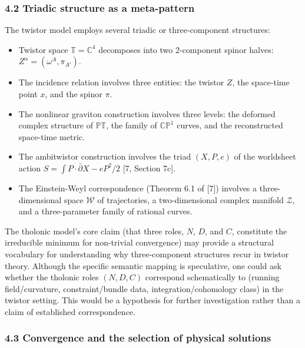 \documentclass[
  11pt,
  letterpaper,
]{article}
\providecommand{\tightlist}{%
  \setlength{\itemsep}{0pt}\setlength{\parskip}{0pt}}
\begin{document}
\subsubsection{4.2 Triadic structure as a
meta-pattern}\label{triadic-structure-as-a-meta-pattern}

The twistor model employs several triadic or three-component structures:

\begin{itemize}
\tightlist
\item
  Twistor space \(\mathbb{T} = \mathbb{C}^4\) decomposes into two
  2-component spinor halves: \(Z^\alpha = (\omega^A, \pi_{A'})\).
\item
  The incidence relation involves three entities: the twistor \(Z\), the
  space-time point \(x\), and the spinor \(\pi\).
\item
  The nonlinear graviton construction involves three levels: the
  deformed complex structure of \(\mathbb{PT}\), the family of
  \(\mathbb{CP}^1\) curves, and the reconstructed space-time metric.
\item
  The ambitwistor construction involves the triad \((X, P, e)\) of the
  worldsheet action \(S = \int P \cdot \bar{\partial} X - e P^2/2\)
  {[}7, Section 7c{]}.
\item
  The Einstein-Weyl correspondence (Theorem 6.1 of {[}7{]}) involves a
  three-dimensional space \(\mathcal{W}\) of trajectories, a
  two-dimensional complex manifold \(\mathcal{Z}\), and a
  three-parameter family of rational curves.
\end{itemize}

The tholonic model's core claim (that three roles, \(N\), \(D\), and
\(C\), constitute the irreducible minimum for non-trivial convergence)
may provide a structural vocabulary for understanding why
three-component structures recur in twistor theory. Although the
specific semantic mapping is speculative, one could ask whether the
tholonic roles \((N, D, C)\) correspond schematically to (running
field/curvature, constraint/bundle data, integration/cohomology class)
in the twistor setting. This would be a hypothesis for further
investigation rather than a claim of established correspondence.

\subsubsection{4.3 Convergence and the selection of physical
solutions}\label{convergence-and-the-selection-of-physical-solutions}
\end{document}
